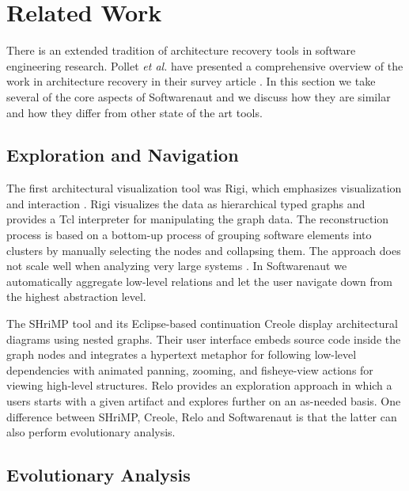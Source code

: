 \documentclass[preprint,12pt]{elsarticle}
\newcommand{\etal}{\emph{et al.}\xspace}
\begin{document}
\section {Related Work} \label {sec:rel}

There is an extended tradition of architecture recovery tools in software engineering research. Pollet \etal have presented a comprehensive overview of the work in architecture recovery in their survey article \cite{pollet-sar}. In this section we take several of the core aspects of Softwarenaut and we discuss how they are similar and how they differ from other state of the art tools.

\subsection {Exploration and Navigation} 

The first architectural visualization tool was Rigi, which emphasizes visualization and interaction \cite{muller-revengenv}. Rigi visualizes the data as hierarchical typed graphs and provides a Tcl interpreter for manipulating the graph data. The reconstruction process is based on a bottom-up process of grouping  software elements into clusters by manually selecting the nodes and collapsing them. The approach does not scale well when analyzing very large systems . In Softwarenaut we automatically aggregate low-level relations and let the user navigate down from the highest abstraction level. 

The SHriMP tool \cite{storey-shrimp} and its Eclipse-based continuation Creole \cite{lintern-creole} display architectural diagrams using nested graphs. Their user interface embeds source code inside the graph nodes and integrates a hypertext metaphor for following low-level dependencies with animated panning, zooming, and fisheye-view actions for viewing high-level structures. Relo \cite{sinh-relo} provides an exploration approach in which a users starts with a given artifact and explores further on an as-needed basis. One difference between SHriMP, Creole, Relo and Softwarenaut is that the latter can also perform evolutionary analysis.


\subsection {Evolutionary Analysis}
 
\end{document}
